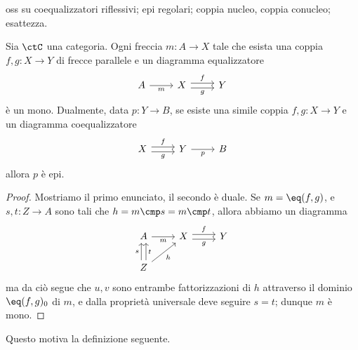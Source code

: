 oss su coequalizzatori riflessivi; epi regolari; coppia nucleo, coppia conucleo; esattezza.
\begin{lemma}
	Sia \(\ctC\) una categoria. Ogni freccia \(m \colon A\to X\) tale che esista una coppia \(f,g \colon X \to Y\) di frecce parallele e un diagramma equalizzatore
	\[\begin{tikzcd}[ampersand replacement=\&]
			A \& X \& Y
			\arrow["m"', from=1-1, to=1-2]
			\arrow["f", shift left=1, from=1-2, to=1-3]
			\arrow["g"', shift right=1, from=1-2, to=1-3]
		\end{tikzcd}\]
	è un mono. Dualmente, data \(p \colon Y\to B\), se esiste una simile coppia \(f,g \colon X \to Y\) e un diagramma coequalizzatore
	\[\begin{tikzcd}[ampersand replacement=\&]
			X \& Y \& B
			\arrow["f", shift left=1, from=1-1, to=1-2]
			\arrow["g"', shift right=1, from=1-1, to=1-2]
			\arrow["p"', from=1-2, to=1-3]
		\end{tikzcd}\]
	allora \(p\) è epi.
\end{lemma}
\begin{proof}
	Mostriamo il primo enunciato, il secondo è duale. Se \(m = \eq(f,g)\), e \(s,t \colon Z \to A\) sono tali che \(h = m \cmp s = m \cmp t\), allora abbiamo un diagramma
	\[\begin{tikzcd}[ampersand replacement=\&]
			A \& X \& Y \\
			Z
			\arrow["m"', from=1-1, to=1-2]
			\arrow["f", shift left, from=1-2, to=1-3]
			\arrow["g"', shift right, from=1-2, to=1-3]
			\arrow["s", shift left, from=2-1, to=1-1]
			\arrow["t"', shift right, from=2-1, to=1-1]
			\arrow["h"', from=2-1, to=1-2]
		\end{tikzcd}\]
	ma da ciò segue che \(u,v\) sono entrambe fattorizzazioni di \(h\)	attraverso il dominio \(\eq(f,g)_0\) di \(m\), e dalla proprietà universale deve seguire \(s=t\); dunque \(m\) è mono.
\end{proof}
Questo motiva la definizione seguente.
